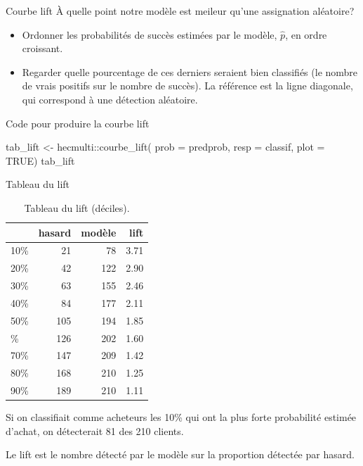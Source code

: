 \documentclass[
  ignorenonframetext,
]{beamer}
\newenvironment{Shaded}{\begin{snugshade}}{\end{snugshade}}
\newcommand{\AttributeTok}[1]{\textcolor[rgb]{0.40,0.45,0.13}{#1}}
\newcommand{\ConstantTok}[1]{\textcolor[rgb]{0.56,0.35,0.01}{#1}}
\newcommand{\FunctionTok}[1]{\textcolor[rgb]{0.28,0.35,0.67}{#1}}
\newcommand{\NormalTok}[1]{\textcolor[rgb]{0.00,0.23,0.31}{#1}}
\newcommand{\OtherTok}[1]{\textcolor[rgb]{0.00,0.23,0.31}{#1}}
\newcommand{\SpecialCharTok}[1]{\textcolor[rgb]{0.37,0.37,0.37}{#1}}
\providecommand{\tightlist}{%
  \setlength{\itemsep}{0pt}\setlength{\parskip}{0pt}}\usepackage{longtable,booktabs,array}
\begin{document}
\begin{frame}{Courbe lift}
\protect\hypertarget{courbe-lift}{}
À quelle point notre modèle est meileur qu'une assignation aléatoire?

\begin{itemize}
\tightlist
\item
  Ordonner les probabilités de succès estimées par le modèle,
  \(\widehat{p}\), en ordre croissant.
\item
  Regarder quelle pourcentage de ces derniers seraient bien classifiés
  (le nombre de vrais positifs sur le nombre de succès). La référence
  est la ligne diagonale, qui correspond à une détection aléatoire.
\end{itemize}
\end{frame}

\begin{frame}[fragile]{Code pour produire la courbe lift}
\protect\hypertarget{code-pour-produire-la-courbe-lift}{}
\begin{Shaded}
\begin{Highlighting}[numbers=left,,]
\NormalTok{tab\_lift }\OtherTok{\textless{}{-}}\NormalTok{ hecmulti}\SpecialCharTok{::}\FunctionTok{courbe\_lift}\NormalTok{(}
  \AttributeTok{prob =}\NormalTok{ predprob,}
  \AttributeTok{resp =}\NormalTok{ classif, }
  \AttributeTok{plot =} \ConstantTok{TRUE}\NormalTok{)}
\NormalTok{tab\_lift}
\end{Highlighting}
\end{Shaded}
\end{frame}

\begin{frame}{Tableau du lift}
\protect\hypertarget{tableau-du-lift}{}
\hypertarget{tbl-lift}{}
\begin{table}
\caption{\label{tbl-lift}Tableau du lift (déciles). }\tabularnewline

\centering
\begin{tabular}{lrrr}
\toprule
  & hasard & modèle & lift\\
\midrule
10\% & 21 & 78 & 3.71\\
20\% & 42 & 122 & 2.90\\
30\% & 63 & 155 & 2.46\\
40\% & 84 & 177 & 2.11\\
50\% & 105 & 194 & 1.85\\
\addlinespace
60\% & 126 & 202 & 1.60\\
70\% & 147 & 209 & 1.42\\
80\% & 168 & 210 & 1.25\\
90\% & 189 & 210 & 1.11\\
\bottomrule
\end{tabular}
\end{table}

\footnotesize

Si on classifiait comme acheteurs les 10\% qui ont la plus forte
probabilité estimée d'achat, on détecterait 81 des 210 clients.

Le lift est le nombre détecté par le modèle sur la proportion détectée
par hasard. \normalsize
\end{frame}
\end{document}
